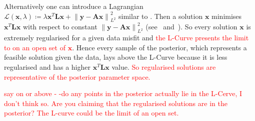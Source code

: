 Alternatively one can introduce a Lagrangian $\mathcal{L}(\bm{x},\lambda)\coloneqq\lambda\bm{x}^T\bm{L} \bm{x}+\left\lVert\bm{y}-\bm{A}\bm{x}\right\rVert^2_{L^2}$ similar to \cite{LiLagrange}.
Then a solution $\bm{x}$ minimises $ \bm{x}^T \bm{L} \bm{x}$ with respect to constant $\left\lVert \bm{y} - \bm{A} \bm{x} \right\rVert^2_{L^2}$ (see~\cite[fn. 6]{fox2016fast} and~\cite[Fig. 2.13]{SANTOSH202265}). 
So every solution $\bm{x}$ is extremely regularised for a given data misfit and \textcolor{red}{the L-Curve presents the limit to on an open set of $\bm{x}$}.
Hence every sample of the posterior, which represents a feasible solution given the data, lays above the L-Curve because it is less regularised and has a higher $ \bm{x}^T \bm{L} \bm{x}$ value.
\textcolor{red}{So regularised solutions are representative of the posterior parameter space.}

\textcolor{red}{say on or above - -do any points in the posterior actually lie in the L-Cerve, I don't think so. Are you claiming that the regularised solutions are in the posterior? The L-curve could be the limit of an open set.}



